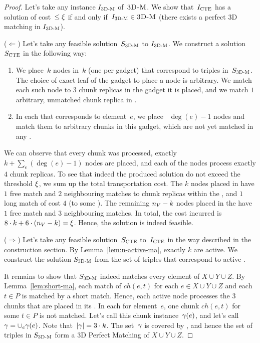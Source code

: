 \begin{proof}
  
  Let's take any instance $I_{\mathrm{\textsc{3D-M}}}$ of~$\textsc{3D-M}$.
  We show that~$I_{\mathrm{\textsc{CTE}}}$ has a solution of cost~$\leq \xi$ if and only if~$I_{\mathrm{\textsc{3D-M}}} \in \textsc{3D-M}$ (there exists a perfect 3D matching in $I_{\mathrm{\textsc{3D-M}}}$).

  ($\Leftarrow$) Let's take any feasible solution~$S_{\mathrm{\textsc{3D-M}}}$ to $I_{\mathrm{\textsc{3D-M}}}$.
  We construct a solution~$S_{\mathrm{\textsc{CTE}}}$ in the following way:
  \begin{enumerate}
    \item We place~$k$ nodes in~$k$ {\TripleGadgets} (one per gadget) that correspond to triples in~$S_{\mathrm{\textsc{3D-M}}}$.
    The choice of exact leaf of the gadget to place a node is arbitrary.
    We match each such node to $3$ chunk replicas in the gadget it is placed, and we match $1$ arbitrary, unmatched chunk replica in {\UnqSubtree}.
    \item In each {\ElGadget} that corresponds to element~$e$, we place
   ~$\deg(e) - 1$ nodes and match them to arbitrary chunks in this
    gadget, which are not yet matched in any {\TripleGadget}.
  \end{enumerate}

  We can observe that every chunk was processed, exactly $k + \sum_e(\deg(e) - 1)$ nodes are placed, and each of the nodes process exactly $4$ chunk replicas.
  To see that indeed the produced solution do not exceed the threshold $\xi$, we sum up the total transportation cost.
  The $k$ nodes placed in \TripleGadgets{} have $1$ free match and $2$ neighbouring matches to chunk replicas within the \TripleGadget{}, and $1$ long match of cost $4$ (to some \UnqGadget{}).
  The remaining $n_V-k$ nodes placed in the \CoverSubtree{} have $1$ free match and $3$ neighbouring matches.
  In total, the cost incurred is $8\cdot k + 6\cdot (n_V - k) = \xi$.
  Hence, the solution is indeed feasible.

  ($\Rightarrow$) Let's take any feasible solution~$S_{\mathrm{\textsc{CTE}}}$ to~$I_{\mathrm{\textsc{CTE}}}$ in the way described in the construction section.
  By Lemma~\ref{lem:n-active-ma}, exactly $k$ \TripleGadgets{} are active.
  We construct the solution $S_{\mathrm{\textsc{3D-M}}}$ from the set of triples that correspond to active \TripleGadgets{}.

  It remains to show that $S_{\mathrm{\textsc{3D-M}}}$ indeed matches every element of $X\cup Y\cup Z$.
  By Lemma~\ref{lem:short-ma}, each match of $ch(e, t)$ for each $e\in X\cup Y\cup Z$ and each $t \in P$ is matched by a short match.
  Hence, each active node processes the 3 chunks that are placed in its \TripleGadget.
  In each {\ElGadget} for element~$e$, one chunk $ch(e, t)$ for some $t \in P$ is not matched.
  Let's call this chunk instance~$\gamma(e)$, and let's call~$\gamma = \cup_e \gamma(e)$.
  Note that~$|\gamma| = 3\cdot k$.
  The set~$\gamma$ is covered by \ActiveNodes{}, and hence the set of triples in $S_{\mathrm{\textsc{3D-M}}}$ form a 3D Perfect Matching of $X\cup Y\cup Z$.
\end{proof}



